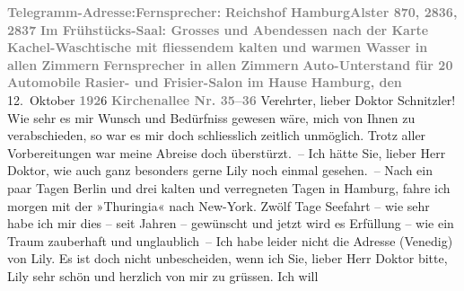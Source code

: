 \begin{ledgroupsized}[t]{13cm}
           \noindent{}\textcolor{gray}{\textbf{Telegramm-Adresse:}}\hfill \textcolor{gray}{\textbf{Fernsprecher:}}\pend
           \pstart
           \textcolor{gray}{\textbf{Reichshof Hamburg}}\hfill \textcolor{gray}{\textbf{Alster 870, 2836, 2837}}\pend
           \pstart
           \centering{}\textcolor{gray}{\textbf{Im Frühstücks-Saal: Grosses und Abendessen nach der
                            Karte}}\pend
           \pstart
           \noindent{}\centering{}\textcolor{gray}{\textbf{Kachel-Waschtische mit fliessendem kalten und warmen
                            Wasser in allen Zimmern}}\pend
           \pstart
           \noindent{}\textcolor{gray}{\textbf{Fernsprecher in allen Zimmern}}\pend
           \pstart
           \textcolor{gray}{\textbf{Auto-Unterstand für 20 Automobile}}\pend
           \pstart
           \textcolor{gray}{\textbf{Rasier- und Frisier-Salon im Hause}}\pend
           \pstart
           \raggedleft{}\textcolor{gray}{\textbf{Hamburg, den}}{ }12. Oktober \textcolor{gray}{\textbf{192}}6\pend
           \pstart
           \raggedleft{}\textcolor{gray}{\textbf{Kirchenallee Nr. 35–36}}\pend
           \pstart{}Verehrter, lieber Doktor Schnitzler!\pend\pstart
           Wie sehr es mir Wunsch und Bedürfniss gewesen wäre, mich von Ihnen zu
                    verabschieden, so war es mir doch schliesslich zeitlich unmöglich. Trotz aller
                    Vorbereitungen war meine Abreise doch überstürzt. –\pend
           \pstart
           Ich hätte Sie, lieber Herr Doktor, wie auch ganz besonders gerne Lily noch einmal gesehen. –\pend
           \pstart
           Nach ein paar Tagen Berlin und drei kalten und
                    verregneten Tagen in Hamburg, fahre ich morgen
                    mit der »Thuringia« nach New-York.\pend
           \pstart
           Zwölf Tage Seefahrt – wie sehr habe ich mir dies – seit Jahren – gewünscht und
                    jetzt wird es Erfüllung – wie ein Traum zauberhaft und unglaublich –\pend
           \pstart
           Ich habe leider nicht die Adresse (Venedig) von
                        Lily.\pend
           \pstart
           Es ist doch nicht unbescheiden, wenn ich Sie, lieber Herr Doktor {\pb}bitte, Lily sehr schön und herzlich von mir zu grüssen. Ich will

\end{ledgroupsized}
